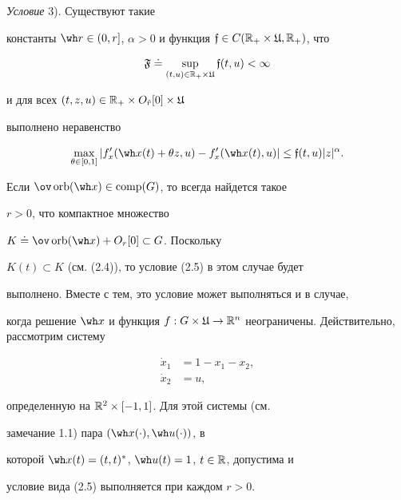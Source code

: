{\it Условие} 3). Существуют такие


константы $\wh r\in(0,r]$, $\alpha >0$ и функция $\frak f\in


C(\bR_+\times\frak U,\bR_+)$, что


\begin{equation}


\frak F\doteq\sup_{(t,u)\in\bR_+\times \frak U}


\frak f(t,u)<\infty


\end{equation}


и для всех $(t,z,u)\in\Bbb R_+\times O_{\Hat r}[0]\times\frak U$


выполнено неравенство


\begin{equation}


\max_{\theta\in [0,1]}|f'_x(\wh


x(t)+\theta z,u)-f'_x(\wh x(t),u)|


\le\frak f(t,u)|z|^{\alpha}.


\end{equation}





\begin{notes}


Если $\ov\orb(\wh x)\in\comp(G)$, то всегда найдется такое


$r>0$, что компактное множество


$K\doteq\ov\orb(\wh x)+O_{r}[0]\subset G$. Поскольку 


$K(t)\subset K$ (см. (2.4)), то условие (2.5) в этом случае будет


выполнено. Вместе с тем, это условие может выполняться и в случае,


когда решение $\wh x$ и функция $f:G\times\frak


U\to\bR^n$ неограничены. Действительно, рассмотрим систему


\begin{align*}


\Dot x_1&=1-x_1-x_2, \\ \Dot x_2&=u,


\end{align*}


определенную на $\Bbb R^2\times[-1,1]$. Для этой системы (см.


замечание 1.1) пара $(\wh x(\cdot),\wh u(\cdot))$, в


которой $\wh x(t)=(t,t)^*$, $\wh u(t)=1$, $t\in\Bbb R$, допустима и


условие вида (2.5) выполняется при каждом $r>0$.


\end{notes}





